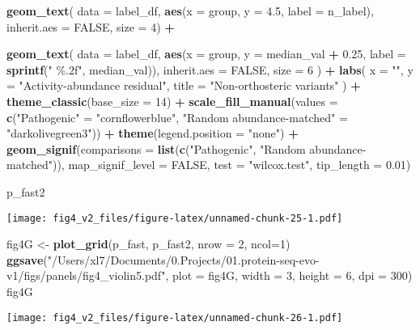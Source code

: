 \documentclass[
]{article}
\newenvironment{Shaded}{\begin{snugshade}}{\end{snugshade}}
\newcommand{\AttributeTok}[1]{\textcolor[rgb]{0.13,0.29,0.53}{#1}}
\newcommand{\ConstantTok}[1]{\textcolor[rgb]{0.56,0.35,0.01}{#1}}
\newcommand{\DecValTok}[1]{\textcolor[rgb]{0.00,0.00,0.81}{#1}}
\newcommand{\FloatTok}[1]{\textcolor[rgb]{0.00,0.00,0.81}{#1}}
\newcommand{\FunctionTok}[1]{\textcolor[rgb]{0.13,0.29,0.53}{\textbf{#1}}}
\newcommand{\NormalTok}[1]{#1}
\newcommand{\OtherTok}[1]{\textcolor[rgb]{0.56,0.35,0.01}{#1}}
\newcommand{\SpecialCharTok}[1]{\textcolor[rgb]{0.81,0.36,0.00}{\textbf{#1}}}
\newcommand{\StringTok}[1]{\textcolor[rgb]{0.31,0.60,0.02}{#1}}
\begin{document}
\begin{Shaded}
\begin{Highlighting}[]
 \FunctionTok{geom\_text}\NormalTok{(}
  \AttributeTok{data =}\NormalTok{ label\_df,}
  \FunctionTok{aes}\NormalTok{(}\AttributeTok{x =}\NormalTok{ group, }\AttributeTok{y =} \FloatTok{4.5}\NormalTok{, }\AttributeTok{label =}\NormalTok{ n\_label),}
  \AttributeTok{inherit.aes =} \ConstantTok{FALSE}\NormalTok{,}
  \AttributeTok{size =} \DecValTok{4}\NormalTok{) }\SpecialCharTok{+}

  \FunctionTok{geom\_text}\NormalTok{(}
    \AttributeTok{data =}\NormalTok{ label\_df,}
    \FunctionTok{aes}\NormalTok{(}\AttributeTok{x =}\NormalTok{ group, }\AttributeTok{y =}\NormalTok{ median\_val }\SpecialCharTok{+} \FloatTok{0.25}\NormalTok{, }\AttributeTok{label =} \FunctionTok{sprintf}\NormalTok{(}\StringTok{" \%.2f"}\NormalTok{, median\_val)),}
    \AttributeTok{inherit.aes =} \ConstantTok{FALSE}\NormalTok{,}
    \AttributeTok{size =} \DecValTok{6}
\NormalTok{  ) }\SpecialCharTok{+}
  \FunctionTok{labs}\NormalTok{(}
    \AttributeTok{x =} \StringTok{""}\NormalTok{,}
    \AttributeTok{y =} \StringTok{"Activity{-}abundance residual"}\NormalTok{,}
    \AttributeTok{title =} \StringTok{"Non{-}orthosteric variants"}
\NormalTok{  ) }\SpecialCharTok{+}
  \FunctionTok{theme\_classic}\NormalTok{(}\AttributeTok{base\_size =} \DecValTok{14}\NormalTok{) }\SpecialCharTok{+}
  \FunctionTok{scale\_fill\_manual}\NormalTok{(}\AttributeTok{values =} \FunctionTok{c}\NormalTok{(}\StringTok{"Pathogenic"} \OtherTok{=} \StringTok{"cornflowerblue"}\NormalTok{, }\StringTok{"Random abundance{-}matched"} \OtherTok{=} \StringTok{"darkolivegreen3"}\NormalTok{)) }\SpecialCharTok{+}
  \FunctionTok{theme}\NormalTok{(}\AttributeTok{legend.position =} \StringTok{"none"}\NormalTok{) }\SpecialCharTok{+}
  \FunctionTok{geom\_signif}\NormalTok{(}\AttributeTok{comparisons =} \FunctionTok{list}\NormalTok{(}\FunctionTok{c}\NormalTok{(}\StringTok{"Pathogenic"}\NormalTok{, }\StringTok{"Random abundance{-}matched"}\NormalTok{)),}
              \AttributeTok{map\_signif\_level =} \ConstantTok{FALSE}\NormalTok{,}
              \AttributeTok{test =} \StringTok{"wilcox.test"}\NormalTok{,}
              \AttributeTok{tip\_length =} \FloatTok{0.01}\NormalTok{)}


\NormalTok{p\_fast2}
\end{Highlighting}
\end{Shaded}

\texttt{[image: fig4\_v2\_files/figure-latex/unnamed-chunk-25-1.pdf]}

\begin{Shaded}
\begin{Highlighting}[]
\NormalTok{fig4G }\OtherTok{\textless{}{-}} \FunctionTok{plot\_grid}\NormalTok{(p\_fast, p\_fast2, }\AttributeTok{nrow =} \DecValTok{2}\NormalTok{, }\AttributeTok{ncol=}\DecValTok{1}\NormalTok{)}
\FunctionTok{ggsave}\NormalTok{(}\StringTok{"/Users/xl7/Documents/0.Projects/01.protein{-}seq{-}evo{-}v1/figs/panels/fig4\_violin5.pdf"}\NormalTok{, }
       \AttributeTok{plot =}\NormalTok{ fig4G, }\AttributeTok{width =} \DecValTok{3}\NormalTok{, }\AttributeTok{height =} \DecValTok{6}\NormalTok{, }\AttributeTok{dpi =} \DecValTok{300}\NormalTok{)}
\NormalTok{fig4G}
\end{Highlighting}
\end{Shaded}

\texttt{[image: fig4\_v2\_files/figure-latex/unnamed-chunk-26-1.pdf]}
\end{document}
